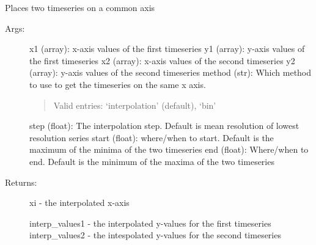 \documentclass[letterpaper,10pt,english]{sphinxmanual}
\begin{document}

\begin{fulllineitems}
\label{\detokenize{Timeseries:pyleoclim.Timeseries.onCommonAxis}}
Places two timeseries on a common axis
\begin{description}
\item[{Args:}] \leavevmode
x1 (array): x-axis values of the first timeseries
y1 (array): y-axis values of the first timeseries
x2 (array): x-axis values of the second timeseries
y2 (array): y-axis values of the second timeseries
method (str): Which method to use to get the timeseries on the same x axis.
\begin{quote}

Valid entries: ‘interpolation’ (default), ‘bin’
\end{quote}

step (float): The interpolation step. Default is mean resolution
of lowest resolution series
start (float): where/when to start. Default is the maximum of the minima of
the two timeseries
end (float): Where/when to end. Default is the minimum of the maxima of
the two timeseries

\item[{Returns:}] \leavevmode
xi -  the interpolated x-axis

interp\_values1 -  the interpolated y-values for the first timeseries
interp\_values2 - the intespolated y-values for the second timeseries

\end{description}

\end{fulllineitems}

\end{document}

